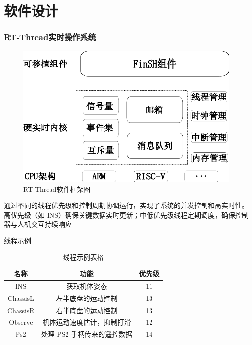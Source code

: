 \documentclass{beamer}
\begin{document}
	\section[软件设计]{软件设计}
	\begin{frame}
		\frametitle{RT-Thread实时操作系统}
		\begin{figure}
			\centering
			\includegraphics[width=0.6\linewidth]{img/chapter5/rtthread}
			\captionsetup{font=scriptsize}
			\caption{RT-Thread软件框架图}
		\end{figure}
		通过不同的线程优先级和控制周期协调运行，实现了系统的并发控制和高实时性。高优先级（如 INS）确保关键数据实时更新；中低优先级线程定期调度，确保控制器与人机交互持续响应
	\end{frame}
		

				

	
	\begin{frame}{线程示例}
		\begin{table}[H]
			\centering
			\caption{线程示例表格}
			\Large
			\begin{tabular}{ccc}
				\toprule
				\textbf{名称} & \textbf{功能} & \textbf{优先级} \\
				\midrule
				INS       & 获取机体姿态                  & 11 \\
				ChassisL  & 左半底盘的运动控制            & 13 \\
				ChassisR  & 右半底盘的运动控制            & 13 \\
				Observe   & 机体运动速度估计，抑制打滑    & 12 \\
				Ps2       & 处理 PS2 手柄传来的遥控数据    & 14 \\
				\bottomrule
			\end{tabular}
		\end{table}
	\end{frame}
	
\end{document}
